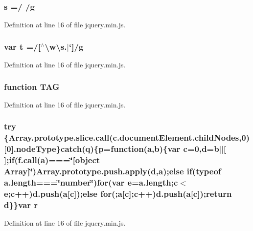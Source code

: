 \subsubsection[{s}]{\setlength{\rightskip}{0pt plus 5cm}s =/ /{\bf g}}\label{jquery_8min_8js_a3691308f2a4c2f6983f2880d32e29c84}


Definition at line 16 of file jquery.\-min.\-js.

\subsubsection[{t}]{\setlength{\rightskip}{0pt plus 5cm}var t =/[$^\wedge$\textbackslash{}w\textbackslash{}s.$|$`]/{\bf g}}\label{jquery_8min_8js_a5459dd59c2ac7c323d9ca8bca22ff249}


Definition at line 16 of file jquery.\-min.\-js.

\subsubsection[{T\-A\-G}]{\setlength{\rightskip}{0pt plus 5cm}function T\-A\-G}\label{jquery_8min_8js_aea0e632f010b6cfccd07a58ad45cd990}


Definition at line 16 of file jquery.\-min.\-js.

\subsubsection[{try}]{\setlength{\rightskip}{0pt plus 5cm}try \{Array.\-prototype.\-slice.\-call(c.\-document\-Element.\-child\-Nodes,0)[0].node\-Type\}catch({\bf q})\{{\bf p}=function({\bf a},{\bf b})\{var c=0,d={\bf b}$|$$|$[$\,$];{\bf if}(f.\-call({\bf a})===\char`\"{}[object Array]\char`\"{})Array.\-prototype.\-push.\-apply(d,{\bf a});{\bf else} {\bf if}(typeof a.\-length===\char`\"{}number\char`\"{})for(var {\bf e}=a.\-length;c$<${\bf e};c++)d.\-push({\bf a}[c]);{\bf else} {\bf for}(;{\bf a}[c];c++)d.\-push({\bf a}[c]);return d\}\}var {\bf r}}\label{jquery_8min_8js_abe4cc9788f52e49485473dc699537388}


Definition at line 16 of file jquery.\-min.\-js.

